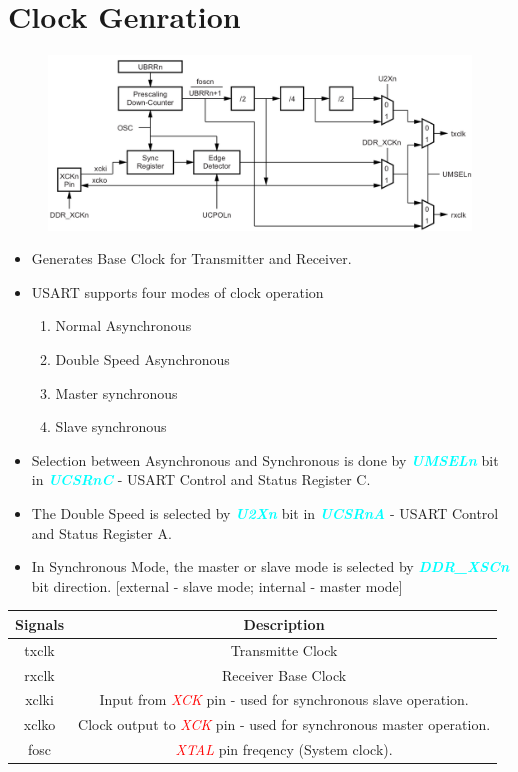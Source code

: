 \documentclass{article}
\newcommand{\bitFormat}[1]{\emph{\textbf{\textcolor{cyan}{#1}}}}
\newcommand{\pinFormat}[1]{\emph{\textcolor{red}{#1}}}
\begin{document}
\section{Clock Genration}
\begin{figure}[H]
    \centering
    \includegraphics[width=1\textwidth]{USART0ClockGeneration.png}
\end{figure}
\begin{itemize}
    \item Generates Base Clock for Transmitter and Receiver.
    \item USART supports four modes of clock operation
    \begin{enumerate}[label=(\roman*)]
        \item Normal Asynchronous
        \item Double Speed Asynchronous
        \item Master synchronous
        \item Slave synchronous
    \end{enumerate}
    \item Selection between Asynchronous and Synchronous is done by \bitFormat{UMSELn} bit in \bitFormat{UCSRnC} - USART Control and Status Register C.
    \item The Double Speed is selected by \bitFormat{U2Xn} bit in \bitFormat{UCSRnA} - USART Control and Status Register A.
    \item In Synchronous Mode, the master or slave mode is selected by \bitFormat{DDR\_XSCn} bit direction. [external - slave mode; internal - master mode]
\end{itemize}
\begin{table}[H]
    \begin{center}
        \begin{tabular}{c|c}
            \textbf{Signals} & \textbf{Description}\\
            \hline
            txclk & Transmitte Clock\\
            rxclk & Receiver Base Clock\\
            xclki & Input from \pinFormat{XCK} pin - used for synchronous slave operation.\\
            xclko & Clock output to \pinFormat{XCK} pin - used for synchronous master operation.\\
            fosc & \pinFormat{XTAL} pin freqency (System clock).
        \end{tabular}
    \end{center}
\end{table}
\end{document}
